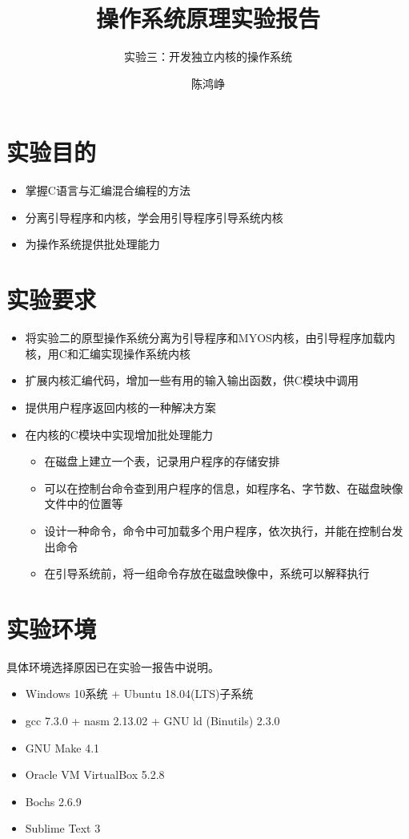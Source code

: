 \documentclass[logo,reportComp]{thesis}
\title{操作系统原理实验报告}
\subtitle{实验三：开发独立内核的操作系统}
\author{陈鸿峥}
\begin{document}
\maketitle

\section{实验目的}
\begin{itemize}
    \item 掌握C语言与汇编混合编程的方法
    \item 分离引导程序和内核，学会用引导程序引导系统内核
    \item 为操作系统提供批处理能力
\end{itemize}

\section{实验要求}
\begin{itemize}
    \item 将实验二的原型操作系统分离为引导程序和MYOS内核，由引导程序加载内核，用C和汇编实现操作系统内核
    \item 扩展内核汇编代码，增加一些有用的输入输出函数，供C模块中调用
    \item 提供用户程序返回内核的一种解决方案
    \item 在内核的C模块中实现增加批处理能力
    \begin{itemize}
        \item 在磁盘上建立一个表，记录用户程序的存储安排
        \item 可以在控制台命令查到用户程序的信息，如程序名、字节数、在磁盘映像文件中的位置等
        \item 设计一种命令，命令中可加载多个用户程序，依次执行，并能在控制台发出命令
        \item 在引导系统前，将一组命令存放在磁盘映像中，系统可以解释执行
    \end{itemize}
\end{itemize}

\section{实验环境}
具体环境选择原因已在实验一报告中说明。
\begin{itemize}
	\item Windows 10系统 + Ubuntu 18.04(LTS)子系统
	\item gcc 7.3.0 + nasm 2.13.02 + GNU ld (Binutils) 2.3.0
    \item GNU Make 4.1
	\item Oracle VM VirtualBox 5.2.8
    \item Bochs 2.6.9
	\item Sublime Text 3
\end{itemize}
\end{document}

